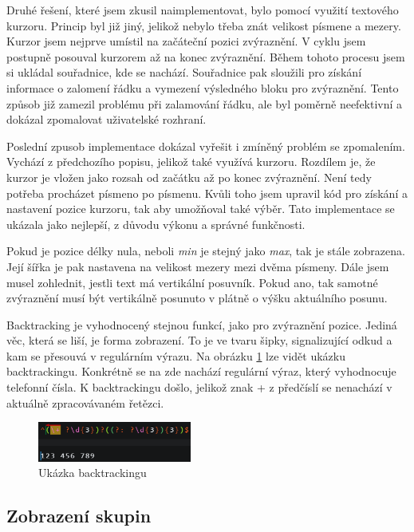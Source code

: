Druhé řešení, které jsem zkusil naimplementovat, bylo pomocí využití textového kurzoru.
Princip byl již jiný, jelikož nebylo třeba znát velikost písmene a mezery.
Kurzor jsem nejprve umístil na začáteční pozici zvýraznění. 
V cyklu jsem postupně posouval kurzorem až na konec zvýraznění.
Během tohoto procesu jsem si ukládal souřadnice, kde se nachází.
Souřadnice pak sloužili pro získání informace o zalomení řádku a vymezení výsledného bloku pro zvýraznění.
Tento způsob již zamezil problému při zalamování řádku, ale byl poměrně neefektivní a dokázal zpomalovat uživatelské rozhraní.

Poslední zpusob implementace dokázal vyřešit i zmíněný problém se zpomalením.
Vychází z předchozího popisu, jelikož také využívá kurzoru.
Rozdílem je, že kurzor je vložen jako rozsah od začátku až po konec zvýraznění.
Není tedy potřeba procházet písmeno po písmenu.
Kvůli toho jsem upravil kód pro získání a nastavení pozice kurzoru, tak aby umožňoval také výběr.
Tato implementace se ukázala jako nejlepší, z důvodu výkonu a správné funkčnosti.

Pokud je pozice délky nula, neboli \textit{min} je stejný jako \textit{max}, tak je stále zobrazena. 
Její šířka je pak nastavena na velikost mezery mezi dvěma písmeny. 
Dále jsem musel zohlednit, jestli text má vertikální posuvník. 
Pokud ano, tak samotné zvýraznění musí být vertikálně posunuto v plátně o výšku aktuálního posunu.

Backtracking je vyhodnocený stejnou funkcí, jako pro zvýraznění pozice.
Jediná věc, která se liší, je forma zobrazení. 
To je ve tvaru šipky, signalizující odkud a kam se přesouvá v regulárním výrazu.
Na obrázku \ref{fig:backtrackingShowcase} lze vidět ukázku backtrackingu.
Konkrétně se na zde nachází regulární výraz, který vyhodnocuje telefonní čísla.
K backtrackingu došlo, jelikož znak + z předčíslí se nenachází v aktuálně zpracovávaném řetězci.

\begin{figure}[!h]
	\centering
	\includegraphics[width=0.45\textwidth]{Figures/backtrackingShowcase.png}
	\caption{Ukázka backtrackingu}
	\label{fig:backtrackingShowcase}
\end{figure} 

\subsection*{Zobrazení skupin}

